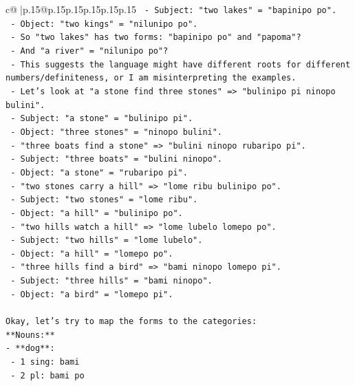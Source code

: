 \documentclass{article}
\begin{document}
{\begin{supertabular}{c@{$\;$}|p{.15\linewidth}@{}p{.15\linewidth}p{.15\linewidth}p{.15\linewidth}p{.15\linewidth}p{.15\linewidth}}
{{{\texttt{       {-} Subject: "two lakes" = "bapinipo po".} \\
\texttt{       {-} Object: "two kings" = "nilunipo po".} \\
\texttt{     {-} So "two lakes" has two forms: "bapinipo po" and "papoma"?} \\
\texttt{     {-} And "a river" = "nilunipo po"?} \\
\texttt{     {-} This suggests the language might have different roots for different numbers/definiteness, or I am misinterpreting the examples.} \\
\texttt{     {-} Let's look at "a stone find three stones" => "bulinipo pi ninopo bulini".} \\
\texttt{       {-} Subject: "a stone" = "bulinipo pi".} \\
\texttt{       {-} Object: "three stones" = "ninopo bulini".} \\
\texttt{     {-} "three boats find a stone" => "bulini ninopo rubaripo pi".} \\
\texttt{       {-} Subject: "three boats" = "bulini ninopo".} \\
\texttt{       {-} Object: "a stone" = "rubaripo pi".} \\
\texttt{     {-} "two stones carry a hill" => "lome ribu bulinipo po".} \\
\texttt{       {-} Subject: "two stones" = "lome ribu".} \\
\texttt{       {-} Object: "a hill" = "bulinipo po".} \\
\texttt{     {-} "two hills watch a hill" => "lome lubelo lomepo po".} \\
\texttt{       {-} Subject: "two hills" = "lome lubelo".} \\
\texttt{       {-} Object: "a hill" = "lomepo po".} \\
\texttt{     {-} "three hills find a bird" => "bami ninopo lomepo pi".} \\
\texttt{       {-} Subject: "three hills" = "bami ninopo".} \\
\texttt{       {-} Object: "a bird" = "lomepo pi".} \\
\\ 
\texttt{Okay, let's try to map the forms to the categories:} \\
\texttt{**Nouns:**} \\
\texttt{{-} **dog**:} \\
\texttt{  {-} 1 sing: bami} \\
\texttt{  {-} 2 pl: bami po} \\
}}}
\end{supertabular}}
\end{document}
